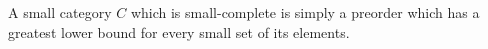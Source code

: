 A small category $C$ which is small-complete is simply a preorder which has a greatest lower bound for every small set of its elements.
